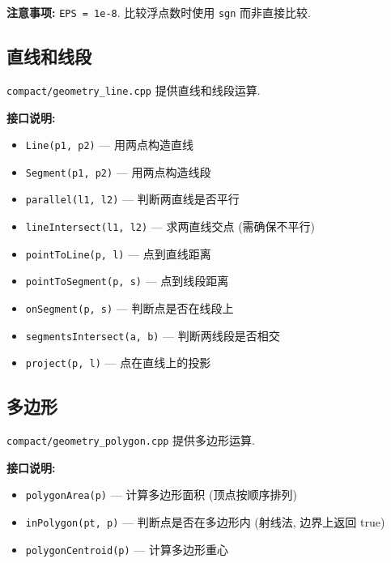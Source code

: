 \documentclass[a4paper]{ctexbook}
\begin{document}
\textbf{注意事项:} \texttt{EPS = 1e-8}. 比较浮点数时使用 \texttt{sgn} 而非直接比较.



\subsection{直线和线段}

\texttt{compact/geometry\_line.cpp} 提供直线和线段运算.

\textbf{接口说明:}
\begin{itemize}
	\item \texttt{Line(p1, p2)} — 用两点构造直线
	\item \texttt{Segment(p1, p2)} — 用两点构造线段
	\item \texttt{parallel(l1, l2)} — 判断两直线是否平行
	\item \texttt{lineIntersect(l1, l2)} — 求两直线交点 (需确保不平行)
	\item \texttt{pointToLine(p, l)} — 点到直线距离
	\item \texttt{pointToSegment(p, s)} — 点到线段距离
	\item \texttt{onSegment(p, s)} — 判断点是否在线段上
	\item \texttt{segmentsIntersect(a, b)} — 判断两线段是否相交
	\item \texttt{project(p, l)} — 点在直线上的投影
\end{itemize}



\subsection{多边形}

\texttt{compact/geometry\_polygon.cpp} 提供多边形运算.

\textbf{接口说明:}
\begin{itemize}
	\item \texttt{polygonArea(p)} — 计算多边形面积 (顶点按顺序排列)
	\item \texttt{inPolygon(pt, p)} — 判断点是否在多边形内 (射线法, 边界上返回 true)
	\item \texttt{polygonCentroid(p)} — 计算多边形重心
\end{itemize}


\end{document}
